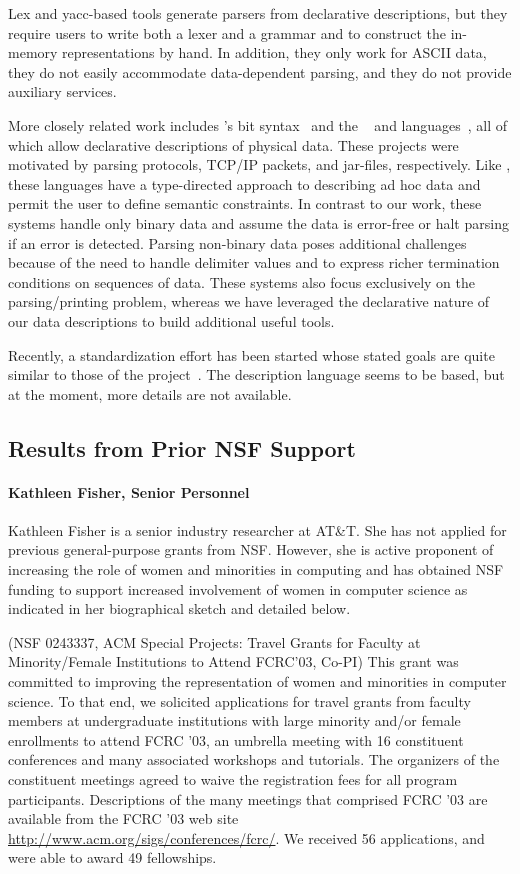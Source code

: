 \documentclass[11pt]{article}
\begin{document}
Lex and yacc-based tools generate parsers from declarative
descriptions, but they require users to write both a lexer and a
grammar and to construct the in-memory representations by hand.  In
addition, they only work for ASCII data, they do not easily
accommodate data-dependent parsing, and they do not provide auxiliary
services.

More closely related work includes \erlang{}'s bit syntax~\cite{erlang} and
the \packettypes{}~\cite{sigcomm00} and
\datascript{} languages~\cite{gpce02}, 
all of which allow declarative descriptions of physical data.  These projects were motivated by parsing protocols,
\textsc{TCP/IP} packets, and \java{} jar-files, respectively.  Like
\pads{}, these languages have a type-directed approach to
describing ad hoc data and permit the user to define semantic constraints.
In contrast to our
work, these systems handle only binary data and assume the data is
error-free or halt parsing if an error is detected. 
Parsing non-binary data poses additional challenges because of the need
to handle delimiter values and to express richer termination conditions
on sequences of data. These systems also
focus exclusively on the parsing/printing problem, whereas we have 
leveraged the declarative nature of
our data descriptions to build additional useful tools.


Recently, a standardization effort has been started whose stated goals are quite similar to those of the \pads{} project~\cite{dfdl}. The description
language seems to be \xml{} based, but at the moment, more details are 
not available.

\subsection{Results from Prior NSF Support}
\label{ssec:results}

\paragraph*{Kathleen Fisher, Senior Personnel} 
Kathleen Fisher is a senior industry researcher at AT\&T.
She has not applied for previous general-purpose grants from NSF.
However, she is active proponent of increasing the
role of women and minorities in computing and has
obtained NSF funding to support increased involvement of women
in computer science as indicated in her biographical sketch
and detailed below.

(NSF 0243337, ACM Special Projects: 
Travel Grants for Faculty at Minority/Female Institutions to Attend
FCRC'03, Co-PI) This grant was committed to improving the representation of women and
minorities in computer science. To that end, we solicited applications
for travel grants from faculty members at undergraduate institutions
with large minority and/or female enrollments to attend FCRC '03, an
umbrella meeting with 16 constituent conferences and many associated
workshops and tutorials.  The organizers of the constituent meetings agreed to waive
the registration fees for all program participants. 
Descriptions of the many meetings that
comprised FCRC '03 are available from the FCRC '03 web site 
\url{http://www.acm.org/sigs/conferences/fcrc/}.  We
received 56 applications, and were able to award 49
fellowships.
\end{document}
